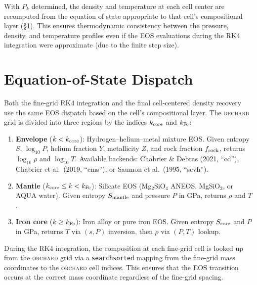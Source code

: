 \documentclass{aastex631}
\newcommand{\orchard}{\textsc{orchard}}
\begin{document}
With $P_k$ determined, the density and temperature at each cell center
are recomputed from the equation of state appropriate to that cell's
compositional layer (\S\ref{sec:eos_dispatch}).  This ensures
thermodynamic consistency between the pressure, density, and temperature
profiles even if the EOS evaluations during the RK4 integration were
approximate (due to the finite step size).

\section{Equation-of-State Dispatch}\label{sec:eos_dispatch}

Both the fine-grid RK4 integration and the final cell-centered density
recovery use the same EOS dispatch based on the cell's compositional
layer.  The \orchard{} grid is divided into three regions by the indices
$k_{\rm core}$ and $k_{\rm Fe}$:

\begin{enumerate}
  \item \textbf{Envelope} ($k < k_{\rm core}$):
    Hydrogen--helium--metal mixture EOS.  Given entropy $S$, $\log_{10}
    P$, helium fraction $Y$, metallicity $Z$, and rock fraction
    $f_{\rm rock}$, returns $\log_{10}\rho$ and $\log_{10}T$.  Available
    backends: Chabrier \& Debras (2021, ``cd''), Chabrier et al.\
    (2019, ``cms''), or Saumon et al.\ (1995, ``scvh'').

  \item \textbf{Mantle} ($k_{\rm core} \leq k < k_{\rm Fe}$):
    Silicate EOS (Mg$_2$SiO$_4$ ANEOS, MgSiO$_3$, or AQUA water).
    Given entropy $S_{\rm mantle}$ and pressure $P$ in GPa, returns
    $\rho$ and $T$.

  \item \textbf{Iron core} ($k \geq k_{\rm Fe}$):
    Iron alloy or pure iron EOS.  Given entropy $S_{\rm core}$ and $P$
    in GPa, returns $T$ via $(s, P)$ inversion, then $\rho$ via $(P,T)$
    lookup.
\end{enumerate}

During the RK4 integration, the composition at each fine-grid cell is
looked up from the \orchard{} grid via a \texttt{searchsorted} mapping
from the fine-grid mass coordinates to the \orchard{} cell indices.
This ensures that the EOS transition occurs at the correct mass
coordinate regardless of the fine-grid spacing.
\end{document}

